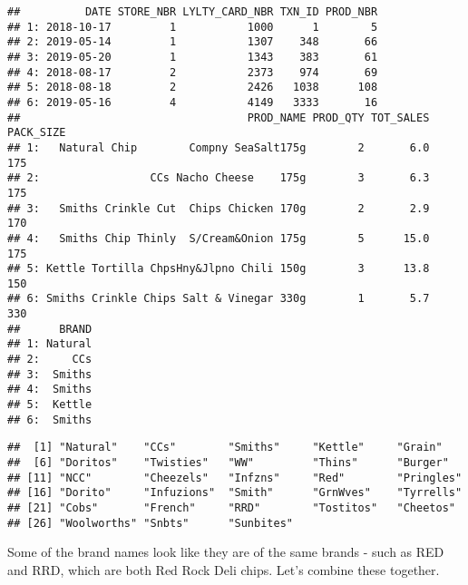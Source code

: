 \documentclass[
]{article}
\newenvironment{Shaded}{\begin{snugshade}}{\end{snugshade}}
\newcommand{\CommentTok}[1]{\textcolor[rgb]{0.56,0.35,0.01}{\textit{#1}}}
\newcommand{\DocumentationTok}[1]{\textcolor[rgb]{0.56,0.35,0.01}{\textbf{\textit{#1}}}}
\newcommand{\FunctionTok}[1]{\textcolor[rgb]{0.13,0.29,0.53}{\textbf{#1}}}
\newcommand{\NormalTok}[1]{#1}
\newcommand{\SpecialCharTok}[1]{\textcolor[rgb]{0.81,0.36,0.00}{\textbf{#1}}}
\begin{document}
\begin{verbatim}
##          DATE STORE_NBR LYLTY_CARD_NBR TXN_ID PROD_NBR
## 1: 2018-10-17         1           1000      1        5
## 2: 2019-05-14         1           1307    348       66
## 3: 2019-05-20         1           1343    383       61
## 4: 2018-08-17         2           2373    974       69
## 5: 2018-08-18         2           2426   1038      108
## 6: 2019-05-16         4           4149   3333       16
##                                   PROD_NAME PROD_QTY TOT_SALES PACK_SIZE
## 1:   Natural Chip        Compny SeaSalt175g        2       6.0       175
## 2:                 CCs Nacho Cheese    175g        3       6.3       175
## 3:   Smiths Crinkle Cut  Chips Chicken 170g        2       2.9       170
## 4:   Smiths Chip Thinly  S/Cream&Onion 175g        5      15.0       175
## 5: Kettle Tortilla ChpsHny&Jlpno Chili 150g        3      13.8       150
## 6: Smiths Crinkle Chips Salt & Vinegar 330g        1       5.7       330
##      BRAND
## 1: Natural
## 2:     CCs
## 3:  Smiths
## 4:  Smiths
## 5:  Kettle
## 6:  Smiths
\end{verbatim}

\begin{Shaded}
\end{Shaded}

\begin{verbatim}
##  [1] "Natural"    "CCs"        "Smiths"     "Kettle"     "Grain"     
##  [6] "Doritos"    "Twisties"   "WW"         "Thins"      "Burger"    
## [11] "NCC"        "Cheezels"   "Infzns"     "Red"        "Pringles"  
## [16] "Dorito"     "Infuzions"  "Smith"      "GrnWves"    "Tyrrells"  
## [21] "Cobs"       "French"     "RRD"        "Tostitos"   "Cheetos"   
## [26] "Woolworths" "Snbts"      "Sunbites"
\end{verbatim}

Some of the brand names look like they are of the same brands - such as
RED and RRD, which are both Red Rock Deli chips. Let's combine these
together.
\end{document}
